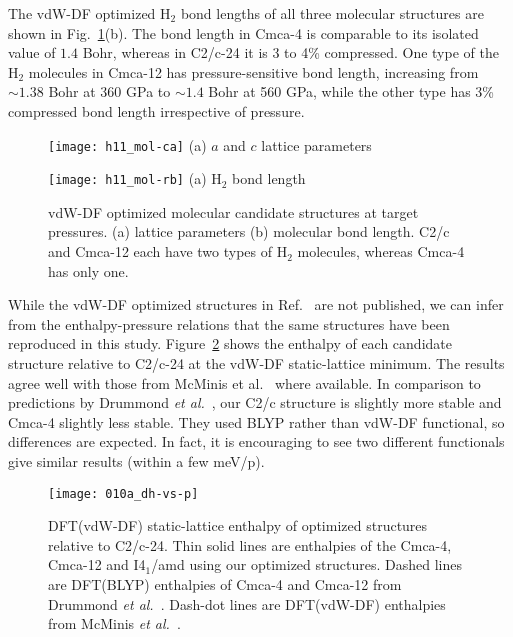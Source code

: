 The vdW-DF optimized H$_2$ bond lengths of all three molecular structures are shown in Fig.~\ref{fig:hsolid-vdw-ca}(b).
The bond length in Cmca-4 is comparable to its isolated value of $1.4$ Bohr, whereas in C2/c-24 it is 3 to 4\% compressed.
One type of the H$_2$ molecules in Cmca-12 has pressure-sensitive bond length, increasing from $\sim 1.38$ Bohr at 360 GPa to $\sim 1.4$ Bohr at 560 GPa, while the other type has 3\% compressed bond length irrespective of pressure.

\begin{figure}[h]
\centering
\begin{minipage}{0.49\textwidth}
\centering
\texttt{[image: h11\_mol-ca]}
(a) $a$ and $c$ lattice parameters
\end{minipage}
\begin{minipage}{0.49\textwidth}
\centering
\texttt{[image: h11\_mol-rb]}
(a) H$_2$ bond length
\end{minipage}
\caption{vdW-DF optimized molecular candidate structures at target pressures. (a) lattice parameters (b) molecular bond length. C2/c and Cmca-12 each have two types of H$_2$ molecules, whereas Cmca-4 has only one.}
\label{fig:hsolid-vdw-ca}
\end{figure}

While the vdW-DF optimized structures in Ref.~\cite{McMinis2015} are not published, we can infer from the enthalpy-pressure relations that the same structures have been reproduced in this study. Figure~\ref{fig:dft-opt-geo} shows the enthalpy of each candidate structure relative to C2/c-24 at the vdW-DF static-lattice minimum. The results agree well with those from McMinis et al.~\cite{McMinis2015} where available.
In comparison to predictions by Drummond \textit{et al.}~\cite{Drummond2015}, our C2/c structure is slightly more stable and Cmca-4 slightly less stable.
They used BLYP rather than vdW-DF functional, so differences are expected. In fact, it is encouraging to see two different functionals give similar results (within a few meV/p).

\begin{figure}[h]
\centering
\texttt{[image: 010a\_dh-vs-p]}
\caption{DFT(vdW-DF) static-lattice enthalpy of optimized structures relative to C2/c-24. Thin solid lines are enthalpies of the Cmca-4, Cmca-12 and I4$_1$/amd using our optimized structures. Dashed lines are DFT(BLYP) enthalpies of Cmca-4 and Cmca-12 from Drummond \textit{et al.}~\cite{Drummond2015}. Dash-dot lines are DFT(vdW-DF) enthalpies from McMinis \textit{et al.}~\cite{McMinis2015}.}
\label{fig:dft-opt-geo}
\end{figure}

